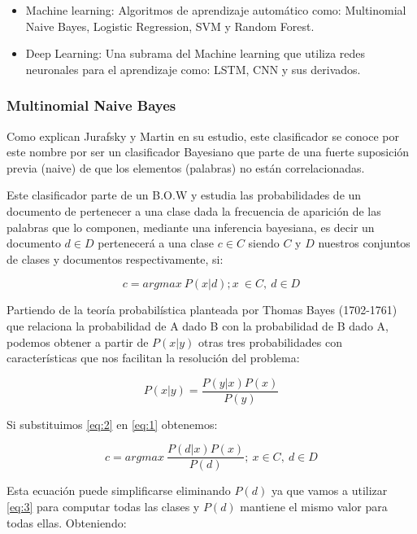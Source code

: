 \begin{itemize}
	\item Machine learning: Algoritmos de aprendizaje automático como: Multinomial Naive Bayes, Logistic Regression, SVM y Random Forest.
	\item Deep Learning: Una subrama del Machine learning que utiliza redes neuronales para el aprendizaje como: LSTM, CNN y sus derivados.
\end{itemize}


\subsubsection{Multinomial Naive Bayes}\label{mb}

Como explican Jurafsky y Martin \cite{NaiveBayes} en su estudio, este clasificador se conoce por este nombre por ser un clasificador Bayesiano que parte de una fuerte suposición previa (naive) de que los elementos (palabras) no están correlacionadas.

Este clasificador parte de un B.O.W y estudia las probabilidades de un documento de pertenecer a una clase dada la frecuencia de aparición de las palabras que lo componen, mediante una inferencia bayesiana, es decir un documento \(d \in D\) pertenecerá a una clase \(c \in C\) siendo \(C\) y \(D\) nuestros conjuntos de clases y documentos respectivamente, si:

\begin{equation} \label{eq:1}
\mathit{c = argmax\ P(x|d); x\ \in C,\ d \in D} 
\end{equation}

Partiendo de la teoría probabilística planteada por Thomas Bayes (1702-1761) que relaciona la probabilidad de A dado B con la probabilidad de B dado A, podemos obtener a partir de \(P(x|y)\) otras tres probabilidades con características que nos facilitan la resolución del problema:

\begin{equation} \label{eq:2}
\mathit{P(x|y) = \frac{P(y|x)P(x)}{P(y)}}
\end{equation}

Si substituimos \ref{eq:2} en \ref{eq:1} obtenemos:

\begin{equation} \label{eq:3}
\mathit{c = argmax\ \frac{P(d|x)P(x)}{P(d)};\ x \in C,\ d \in D}
\end{equation}

Esta ecuación puede simplificarse eliminando \(P(d)\) ya que vamos a utilizar \ref{eq:3} para computar todas las clases y \(P(d)\) mantiene el mismo valor para todas ellas. Obteniendo:

